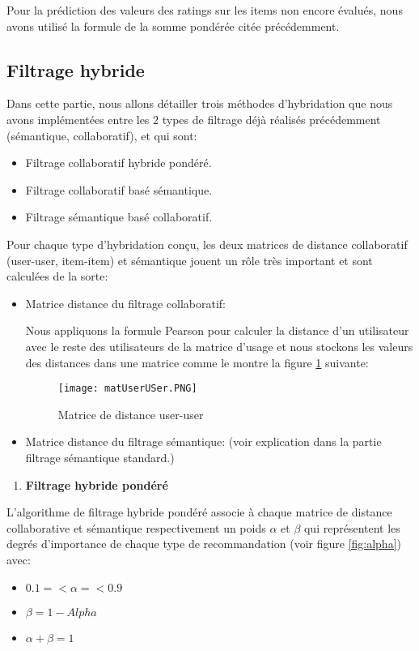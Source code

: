 Pour la prédiction des valeurs des ratings sur les items non encore évalués, nous avons utilisé la formule de la somme pondérée citée précédemment.

\subsection{Filtrage hybride}
Dans cette partie, nous allons détailler trois méthodes d'hybridation que nous avons implémentées entre les 2 types de filtrage déjà réalisés précédemment (sémantique, collaboratif), et qui sont:

\begin{itemize}
	\item Filtrage collaboratif hybride pondéré.
	\item Filtrage collaboratif basé sémantique.
	\item Filtrage sémantique basé collaboratif.
	
\end{itemize}

Pour chaque type d'hybridation conçu, les deux matrices de distance collaboratif (user-user, item-item) et sémantique jouent un rôle très important et sont calculées de la sorte:

\begin{itemize}
\item Matrice distance du filtrage collaboratif: 

Nous appliquons la formule Pearson pour calculer la distance d'un utilisateur avec le reste des utilisateurs de la  matrice d'usage et nous stockons les valeurs des distances dans une matrice comme le montre la figure \ref{fig:distuser} suivante: 

	\begin{figure}[H]
		\centering
		\texttt{[image: matUserUSer.PNG]}
		\caption{Matrice de distance user-user}
		\label{fig:distuser}
	\end{figure}

	\item  Matrice distance du filtrage sémantique: (voir explication dans la partie filtrage sémantique standard.)
\end{itemize}

\begin{enumerate}[nosep,label=\textbf{\arabic*)}]
	\item \textbf{Filtrage hybride pondéré}
\end{enumerate}\mbox{}\indent 
L'algorithme de filtrage hybride pondéré associe à chaque matrice de distance collaborative et sémantique respectivement un poids $\alpha$ et $\beta$ qui représentent les degrés d'importance de chaque type de recommandation (voir figure \ref{fig:alpha}) avec:
\begin{itemize}
	\item  $0.1 =< \alpha =< 0.9$
	\item  $\beta = 1 - Alpha$ 
	\item 	$\alpha + \beta = 1$
\end{itemize}

